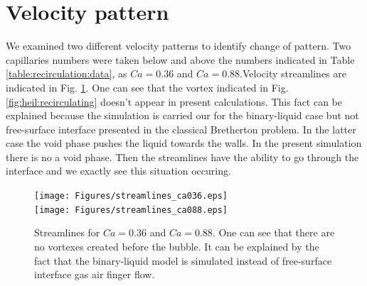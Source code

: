 \documentclass{article}
\begin{document}
\section{Velocity pattern}
\label{sec:velocity}
We examined two different velocity patterns to identify change of pattern. Two capillaries numbers
were taken below and above the numbers indicated in Table \ref{table:recirculation:data}, as
$Ca=0.36$ and $Ca=0.88$.Velocity streamlines are
indicated in Fig. \ref{fig:streamlines:pattern}. One can see that the vortex indicated in
Fig.\ref{fig:heil:recirculating} doesn't appear in present calculations. This fact can be
explained because the simulation is carried our for the binary-liquid case but not free-surface
interface presented in the classical Bretherton problem. In the latter case the void phase pushes
the liquid towards the walls. In the present simulation there is no a void phase. Then the
streamlines have the ability to go through the interface and we exactly see this situation occuring.
\begin{figure}[ht]
\texttt{[image: Figures/streamlines\_ca036.eps]}\\
\texttt{[image: Figures/streamlines\_ca088.eps]}
\caption{Streamlines for $Ca=0.36$ and $Ca=0.88$. One can see that there are no vortexes created
before the bubble. It can be explained by the fact that the binary-liquid model is simulated
instead of free-surface interface gas air finger flow.\label{fig:streamlines:pattern}}
\end{figure}
\end{document}

